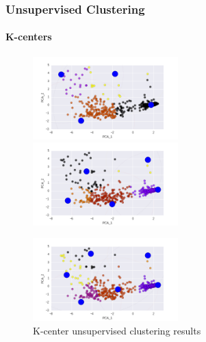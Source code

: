 \documentclass[10pt]{beamer}
\begin{document}
  \begin{frame}
    \frametitle{Unsupervised Clustering}
    \framesubtitle{K-centers}

    \begin{figure}
    \centering
    \includegraphics[width=0.5\textwidth]{m3.png}
    \includegraphics[width=0.5\textwidth]{m4.png}
    \end{figure}

    \begin{figure}
    \centering
    \includegraphics[width=0.5\textwidth]{m5.png}
    \caption{K-center unsupervised clustering results}
    \end{figure}

    \end{frame}
\end{document}
